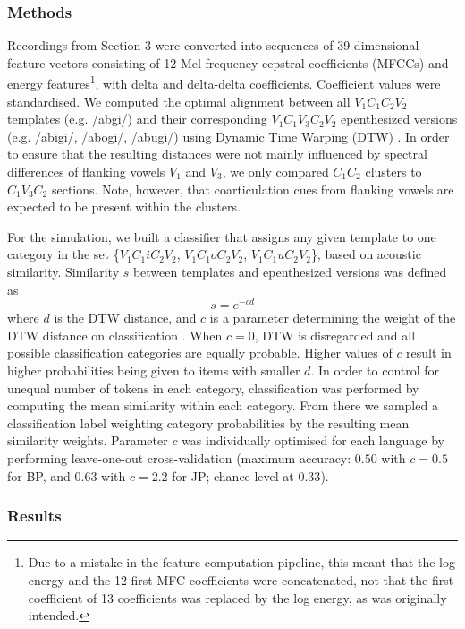 \subsubsection{Methods}
Recordings from Section 3 were converted into sequences of 39-dimensional feature vectors consisting of 12 Mel-frequency cepstral coefficients (MFCCs) and energy features\footnote{Due to a mistake in the feature computation pipeline, this meant that the log energy and the 12 first MFC coefficients were concatenated, not that the first coefficient of 13 coefficients was replaced by the log energy, as was originally intended.}, with delta and delta-delta coefficients. Coefficient values were standardised. We computed the optimal alignment between all $V_{1}C_{1}C_{2}V_{2}$ templates (e.g. /abgi/) and their corresponding $V_{1}C_{1}V_{3}C_{2}V_{2}$ epenthesized versions (e.g. /abigi/, /abogi/, /abugi/) using Dynamic Time Warping (DTW) \cite{sakoe1978, R-dtw}. In order to ensure that the resulting distances were not mainly influenced by spectral differences of flanking vowels $V_{1}$ and $V_{3}$, we only compared $C_{1}C_{2}$ clusters to $C_{1}V_{3}C_{2}$ sections. Note, however, that coarticulation cues from flanking vowels are expected to be present within the clusters. 

For the simulation, we built a classifier that assigns any given template to one category in the set \{$V_{1}C_{1}iC_{2}V_{2}$, $V_{1}C_{1}oC_{2}V_{2}$, $V_{1}C_{1}uC_{2}V_{2}$\}, based on acoustic similarity. Similarity $s$ between templates and epenthesized versions was defined as
% 
\begin{equation}
  s = e^{-cd}
  \label{eq1}
\end{equation}
% 
where $d$ is the DTW distance, and $c$ is a parameter determining the weight of the DTW distance on classification \cite{nosofsky1992}. When $c = 0$, DTW is disregarded and all possible classification categories are equally probable. Higher values of $c$ result in higher probabilities being given to items with smaller $d$. In order to control for unequal number of tokens in each category, classification was performed by computing the mean similarity within each category. From there we sampled a classification label weighting category probabilities by the resulting mean similarity weights. Parameter $c$ was individually optimised for each language by performing leave-one-out cross-validation (maximum accuracy: $0.50$ with $c = 0.5$ for BP, and $0.63$ with $c = 2.2$ for JP; chance level at $0.33$). 

\subsubsection{Results}

